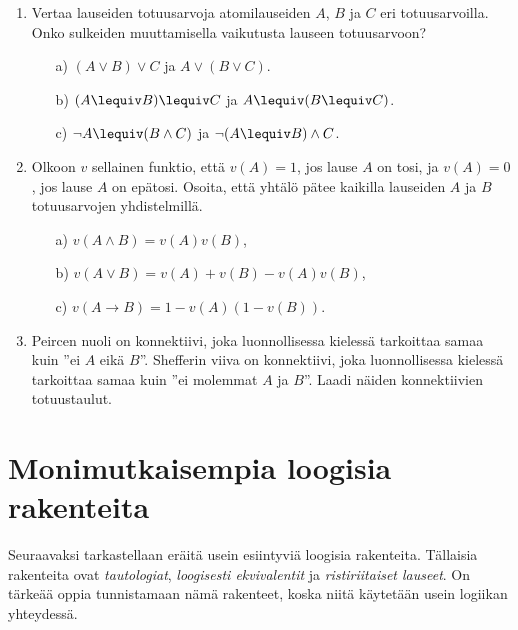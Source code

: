 \begin{enumerate}
\item

Vertaa lauseiden totuusarvoja atomilauseiden $A$, $B$ ja $C$ eri totuusarvoilla. Onko sulkeiden muuttamisella vaikutusta lauseen totuusarvoon?

\begin{itemize}

\item[a)] $(A\lor B)\lor C$ ja $A\lor (B\lor C)$.

\item[b)] $(A\lequiv B)\lequiv C$ ja $A\lequiv (B\lequiv C)$.

\item[c)] $\lnot A \lequiv (B \land C)$ ja $\lnot (A \lequiv B) \land C$.

\end{itemize}


\item
Olkoon $v$ sellainen funktio, että $v(A) = 1$, jos lause $A$ on tosi, ja $v(A) = 0$, jos lause $A$ on epätosi. Osoita, että yhtälö pätee kaikilla lauseiden $A$ ja $B$ totuusarvojen yhdistelmillä.

\begin{itemize}
\item[a)] $v(A\land B)=v(A)v(B)$,
\item[b)] $v(A\lor B)=v(A)+v(B)- v(A)v(B)$,
\item[c)] $v(A\to B)=1-v(A)(1-v(B))$.
\end{itemize}

\item
Peircen nuoli on konnektiivi, joka luonnollisessa kielessä tarkoittaa samaa kuin ''ei $A$ eikä $B$''. Shefferin viiva on konnektiivi, joka luonnollisessa kielessä tarkoittaa samaa kuin ''ei molemmat $A$ ja $B$''. Laadi näiden konnektiivien totuustaulut. 
\end{enumerate}

\newpage

\section{Monimutkaisempia loogisia rakenteita}
\label{monimloog}
Seuraavaksi tarkastellaan eräitä usein esiintyviä loogisia rakenteita. Tällaisia rakenteita ovat {\em tautologiat}, {\em loogisesti ekvivalentit} ja {\em ristiriitaiset lauseet}. On tärkeää oppia tunnistamaan nämä rakenteet, koska niitä käytetään usein logiikan yhteydessä.

